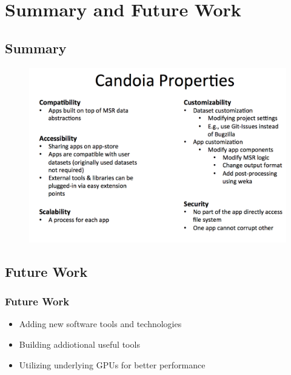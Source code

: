 \section{Summary and Future Work}

    \subsection{Summary}
        \begin{frame}
            \begin{figure}
                \centering
                    \includegraphics[scale=0.2]{figures/summary.png}
            \end{figure}
        \end{frame}


    \subsection{Future Work}
        \begin{frame}
            \frametitle{Future Work}
            \begin{itemize}
                \item Adding new software tools and technologies
                \item Building addiotional useful tools
                \item Utilizing underlying GPUs for better performance
            \end{itemize}
        \end{frame}

